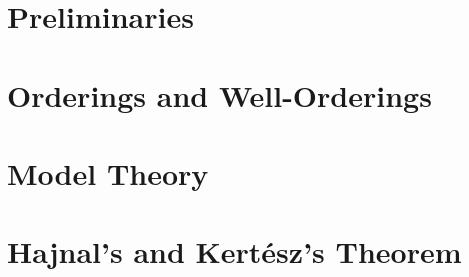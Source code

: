 \documentclass[a4paper,12pt]{memoir}
\numberwithin{equation}{section} %
\theoremstyle{plain} %
\theoremstyle{definition} %
\theoremstyle{remark} %
\begin{document}
\chapter{Preliminaries}


\chapter{Orderings and Well-Orderings}


\chapter{Model Theory}


\chapter{Hajnal's and Kertész's Theorem}




\appendix %


\backmatter





\end{document}

